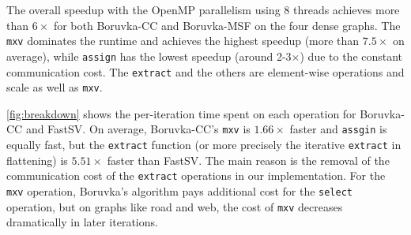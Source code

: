 \documentclass{sokendai_thesis} %
\newcommand{\boruvka}[0]{Boruvka}
\begin{document}
The overall speedup with the OpenMP parallelism using 8 threads achieves more than $6\times$ for both \boruvka{}-CC and \boruvka{}-MSF on the four dense graphs. %
The \texttt{mxv} dominates the runtime and achieves the highest speedup (more than $7.5\times$ on average), while \texttt{assign} has the lowest speedup (around 2-3$\times$) due to the constant communication cost.
The \texttt{extract} and the others are element-wise operations and scale as well as \texttt{mxv}.

\autoref{fig:breakdown} shows the per-iteration time spent on each operation for \boruvka{}-CC and FastSV.
On average, \boruvka{}-CC's \texttt{mxv} is $1.66\times$ faster and \texttt{assgin} is equally fast, but the \texttt{extract} function (or more precisely the iterative \texttt{extract} in flattening) is $5.51\times$ faster than FastSV.
The main reason is the removal of the communication cost of the \texttt{extract} operations in our implementation. %
For the \texttt{mxv} operation, \boruvka{}'s algorithm pays additional cost for the \texttt{select} operation, but on graphs like road and web, the cost of \texttt{mxv} decreases dramatically in later iterations.
\end{document}
